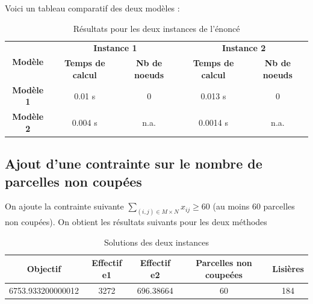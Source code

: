 \documentclass[12pt]{article}
\begin{document}
\noindent Voici un tableau comparatif des deux modèles :

\begin{table}[H]
    \centering
    \begin{tabular}{|c|c|c|c|c|}
    \hline
    \multirow{2}{*}{\textbf{Modèle}} & \multicolumn{2}{c|}{\textbf{Instance 1}}         & \multicolumn{2}{c|}{\textbf{Instance 2}}         \\ \cline{2-5} 
                                     & \textbf{Temps de calcul} & \textbf{Nb de noeuds} & \textbf{Temps de calcul} & \textbf{Nb de noeuds} \\ \hline
    \textbf{Modèle 1}             & 0.01 s                   & 0                     & 0.013 s                  & 0                     \\ \hline
    \textbf{Modèle 2}               & 0.004 s                  & n.a.                  & 0.0014 s                 & n.a.                  \\ \hline
    \end{tabular}
    \caption{Résultats pour les deux instances de l'énoncé}
    \label{tab:results}
\end{table}

\subsection{Ajout d'une contrainte sur le nombre de parcelles non coupées}


\noindent On ajoute la contrainte suivante $\sum\limits_{(i, j)\in M\times N} x_{ij} \geq 60$ (au moins $60$ parcelles non coupées). On obtient les résultats suivants pour les deux méthodes
\begin{table}[H]
    \centering
    \begin{tabular}{|c|c|c|c|c|}
    \hline
                        \textbf{Objectif} & \textbf{Effectif e1} & \textbf{Effectif e2} & \textbf{Parcelles non coupeées} & \textbf{Lisières} \\ \hline
                        6753.933200000012         & 3272                 & 696.38664           & 60                              & 184                \\ \hline
    \end{tabular}
    \caption{Solutions des deux instances}
\end{table}
\end{document}
